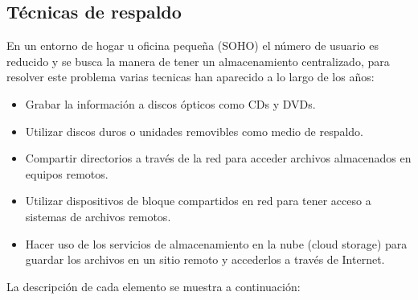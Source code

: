   \subsection {T\'{e}cnicas de respaldo}


En un entorno de hogar u oficina peque\~{n}a (\textsc{SOHO}) el n\'{u}mero de usuario es reducido y se busca la manera de tener un almacenamiento centralizado, para resolver este problema varias tecnicas han aparecido a lo largo de los a\~{n}os:

    \begin{itemize}
      \item Grabar la informaci\'{o}n a discos \'{o}pticos como CDs y DVDs.
      \item Utilizar discos duros o unidades removibles como medio de respaldo.
      \item Compartir directorios a trav\'{e}s de la red para acceder archivos almacenados en equipos remotos.
      \item Utilizar dispositivos de bloque compartidos en red para tener acceso a sistemas de archivos remotos.
      \item Hacer uso de los servicios de almacenamiento en la nube (cloud storage) para guardar los archivos en un sitio remoto y accederlos a trav\'{e}s de Internet.
    \end{itemize}

La descripci\'{o}n de cada elemento se muestra a continuaci\'{o}n:

